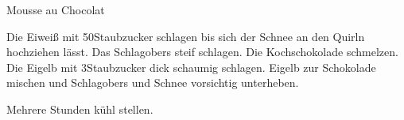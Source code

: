 \begin{recipe}[\vegetarian]{Mousse au Chocolat}

    \begin{ingredients}
    \end{ingredients}

    \begin{instructions}
        Die Eiweiß mit 50\gram Staubzucker schlagen bis sich der Schnee an den Quirln hochziehen lässt. 
        Das Schlagobers steif schlagen.
        Die Kochschokolade schmelzen.
        Die Eigelb mit 3\el Staubzucker dick schaumig schlagen.
        Eigelb zur Schokolade mischen und Schlagobers und Schnee vorsichtig unterheben.

        Mehrere Stunden kühl stellen.
    \end{instructions}
\end{recipe}
